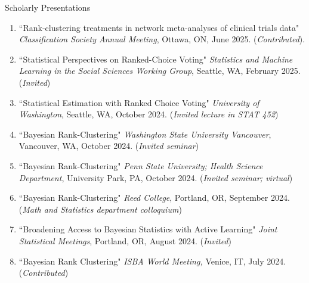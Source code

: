 \documentclass{resume} %
\begin{document}
\begin{rSection}{Scholarly Presentations}

\begin{enumerate}
\item ``Rank-clustering treatments in network meta-analyses of clinical trials data" \textit{Classification Society Annual Meeting}, Ottawa, ON, June 2025. (\textit{Contributed}).
\item ``Statistical Perspectives on Ranked-Choice Voting" \textit{Statistics and Machine Learning in the Social Sciences Working Group}, Seattle, WA, February 2025. (\textit{Invited})
\item ``Statistical Estimation with Ranked Choice Voting" \textit{University of Washington}, Seattle, WA, October 2024. (\textit{Invited lecture in STAT 452})
\item ``Bayesian Rank-Clustering" \textit{Washington State University Vancouver}, Vancouver, WA, October 2024. (\textit{Invited seminar})
\item ``Bayesian Rank-Clustering" \textit{Penn State University; Health Science Department}, University Park, PA, October 2024. (\textit{Invited seminar; virtual})
\item ``Bayesian Rank-Clustering" \textit{Reed College}, Portland, OR, September 2024. (\textit{Math and Statistics department colloquium})
\item ``Broadening Access to Bayesian Statistics with Active Learning" \textit{Joint Statistical Meetings}, Portland, OR, August 2024. (\textit{Invited})
\item ``Bayesian Rank Clustering" \textit{ISBA World Meeting,} Venice, IT, July 2024. (\textit{Contributed})


\end{enumerate}
\end{rSection}
\end{document}
